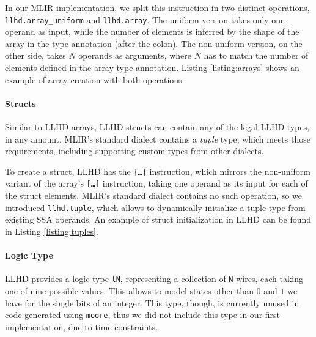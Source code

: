 In our MLIR implementation, we split this instruction in two distinct operations, \texttt{llhd.array\_uniform} and \texttt{llhd.array}. The uniform version takes only one operand as input, while the number of elements is inferred by the shape of the array in the type annotation (after the colon). The non-uniform version, on the other side, takes $N$ operands as arguments, where $N$ has to match the number of elements defined in the array type annotation. Listing \ref{listing:arrays} shows an example of array creation with both operations.


\paragraph{Structs}
Similar to LLHD arrays, LLHD structs can contain any of the legal LLHD types, in any amount. MLIR's standard dialect contains a \textit{tuple} type, which meets those requirements, including supporting custom types from other dialects.

To create a struct, LLHD has the \texttt{\{\ldots\}} instruction, which mirrors the non-uniform variant of the array's \texttt{[\ldots]} instruction, taking one operand as its input for each of the struct elements. MLIR's standard dialect contains no such operation, so we introduced \texttt{llhd.tuple}, which allows to dynamically initialize a tuple type from existing SSA operands. An example of struct initialization in LLHD can be found in Listing \ref{listing:tuples}.


\paragraph{Logic Type}
LLHD provides a logic type \texttt{lN}, representing a collection of \texttt{N} wires, each taking one of nine possible values. This allows to model states other than $0$ and $1$ we have for the single bits of an integer. This type, though, is currently unused in code generated using \texttt{moore}, thus we did not include this type in our first implementation, due to time constraints.

